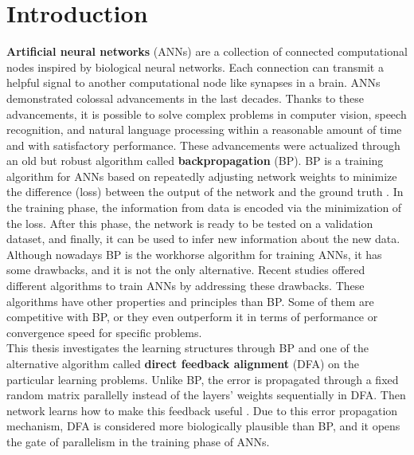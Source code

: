 \documentclass[a4paper, nobind]{templates/ociamthesis}
\begin{document}
\flushbottom

\hypertarget{introduction}{%
\chapter*{Introduction}\label{introduction}}

\adjustmtc
{}

\textbf{Artificial neural networks} (ANNs) are a collection of connected computational nodes inspired by biological neural networks. Each connection can transmit a helpful signal to another computational node like synapses in a brain. ANNs demonstrated colossal advancements in the last decades. Thanks to these advancements, it is possible to solve complex problems in computer vision, speech recognition, and natural language processing within a reasonable amount of time and with satisfactory performance. These advancements were actualized through an old but robust algorithm called \textbf{backpropagation} (BP). BP is a training algorithm for ANNs based on repeatedly adjusting network weights to minimize the difference (loss) between the output of the network and the ground truth \cite{Rumelhart:1986we}. In the training phase, the information from data is encoded via the minimization of the loss. After this phase, the network is ready to be tested on a validation dataset, and finally, it can be used to infer new information about the new data.\\
Although nowadays BP is the workhorse algorithm for training ANNs, it has some drawbacks, and it is not the only alternative. Recent studies offered different algorithms to train ANNs by addressing these drawbacks. These algorithms have other properties and principles than BP. Some of them are competitive with BP, or they even outperform it in terms of performance or convergence speed for specific problems.\\
This thesis investigates the learning structures through BP and one of the alternative algorithm called \textbf{direct feedback alignment} (DFA) on the particular learning problems. Unlike BP, the error is propagated through a fixed random matrix parallelly instead of the layers' weights sequentially in DFA. Then network learns how to make this feedback useful \cite{nøkland2016direct}. Due to this error propagation mechanism, DFA is considered more biologically plausible than BP, and it opens the gate of parallelism in the training phase of ANNs.\\
\end{document}
